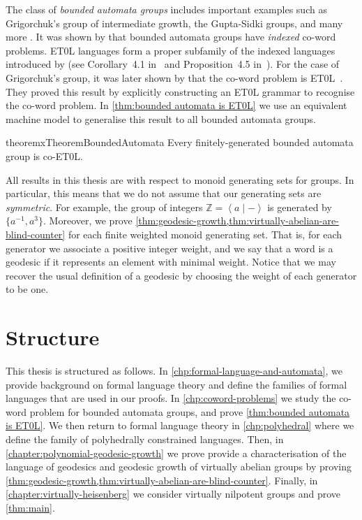 The class of \emph{bounded automata groups} includes important examples such as Grigorchuk's group of intermediate growth, the Gupta-Sidki groups, and many more \cite{grigorchuk1980,gupta1983,nekrashevych2005,sidki2000}.
It was shown by \textcite{holt2006} that bounded automata groups have \emph{indexed} co-word problems.
ET0L languages form a proper subfamily of the indexed languages introduced by \textcite{aho1968} (see Corollary~4.1 in~\cite{culik1974} and Proposition~4.5 in~\cite{ehrenfeucht1976}).
For the case of Grigorchuk's group, it was later shown by \citeauthor{ciobanu2018} that the co-word problem is ET0L~\cite{ciobanu2018}.
They proved this result by explicitly constructing an ET0L grammar to recognise the co-word problem.
In \cref{thm:bounded automata is ET0L} we use an equivalent machine model to generalise this result to all bounded automata groups.

\begin{restatable*}{theoremx}{TheoremBoundedAutomata}\label{thm:bounded automata is ET0L}
	Every finitely-generated bounded automata group is co-ET0L.
\end{restatable*}

All results in this thesis are with respect to monoid generating sets for groups.
In particular, this means that we do not assume that our generating sets are \emph{symmetric}.
For example, the group of integers $\mathbb{Z} = \left\langle a \mid -\right\rangle$ is generated by $\{a^{-1}, a^3\}$.
Moreover, we prove \cref{thm:geodesic-growth,thm:virtually-abelian-are-blind-counter} for each finite weighted monoid generating set.
That is, for each generator we associate a positive integer weight, and we say that a word is a geodesic if it represents an element with minimal weight.
Notice that we may recover the usual definition of a geodesic by choosing the weight of each generator to be one.

\section{Structure}

This thesis is structured as follows.
In \cref{chp:formal-language-and-automata}, we provide background on formal language theory and define the families of formal languages that are used in our proofs.
In \cref{chp:coword-problems} we study the co-word problem for bounded automata groups, and prove \cref{thm:bounded automata is ET0L}.
We then return to formal language theory in \cref{chp:polyhedral} where we define the family of polyhedrally constrained languages.
Then, in \cref{chapter:polynomial-geodesic-growth} we prove provide a characterisation of the language of geodesics and geodesic growth of virtually abelian groups by proving \cref{thm:geodesic-growth,thm:virtually-abelian-are-blind-counter}.
Finally, in \cref{chapter:virtually-heisenberg} we consider virtually nilpotent groups and prove \cref{thm:main}.

